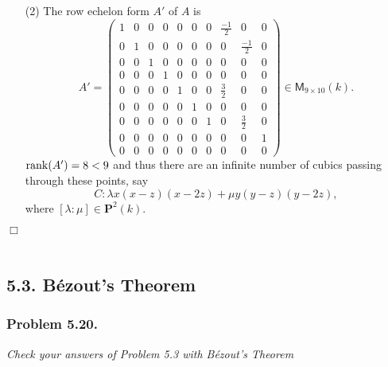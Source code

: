 \documentclass{article}
\begin{document}
\begin{enumerate}
\item[(2)]
  The row echelon form $A'$ of $A$ is
  \[
    A'
    =
    \begin{pmatrix}
      1 & 0 & 0 & 0 & 0 & 0 & 0 & \frac{-1}{2} &            0 & 0 \\
      0 & 1 & 0 & 0 & 0 & 0 & 0 &            0 & \frac{-1}{2} & 0 \\
      0 & 0 & 1 & 0 & 0 & 0 & 0 &            0 &            0 & 0 \\
      0 & 0 & 0 & 1 & 0 & 0 & 0 &            0 &            0 & 0 \\
      0 & 0 & 0 & 0 & 1 & 0 & 0 &  \frac{3}{2} &            0 & 0 \\
      0 & 0 & 0 & 0 & 0 & 1 & 0 &            0 &            0 & 0 \\
      0 & 0 & 0 & 0 & 0 & 0 & 1 &            0 &  \frac{3}{2} & 0 \\
      0 & 0 & 0 & 0 & 0 & 0 & 0 &            0 &            0 & 1 \\
      0 & 0 & 0 & 0 & 0 & 0 & 0 &            0 &            0 & 0
    \end{pmatrix} \in \mathsf{M}_{9 \times 10}(k).
  \]
  $\rank(A') = 8 < 9$ and thus
  there are an infinite number of cubics passing through these points, say
  \[
    C: \lambda x(x-z)(x-2z) + \mu y(y-z)(y-2z),
  \]
  where $[\lambda:\mu] \in \mathbf{P}^2(k)$.
\end{enumerate}
$\Box$ \\\\






\subsection*{5.3. B\'ezout's Theorem \\}



\subsubsection*{Problem 5.20.}
\emph{Check your answers of Problem 5.3 with B\'ezout's Theorem} \\
\end{document}
